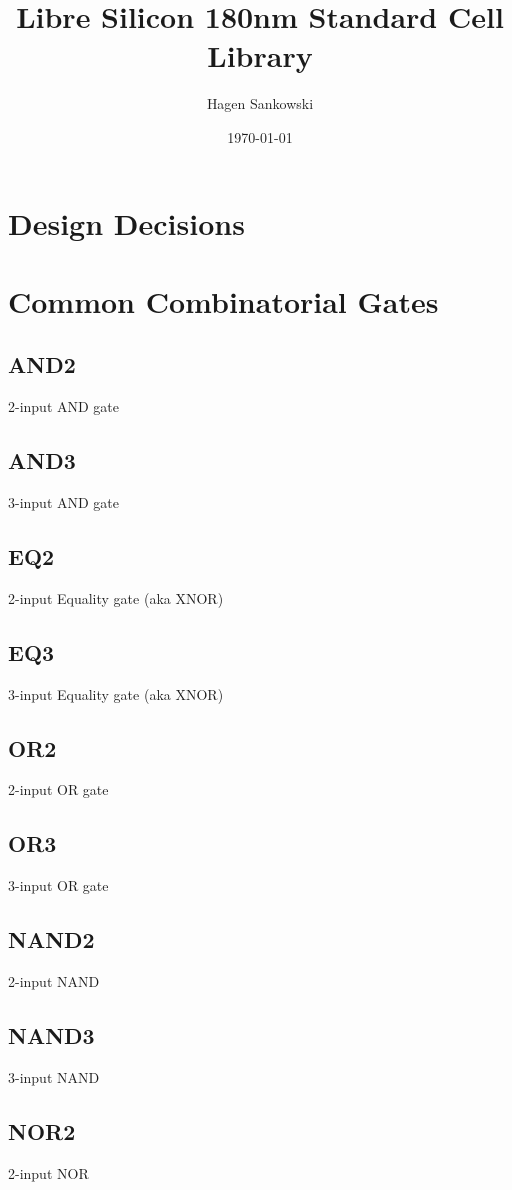 \documentclass[12pt, a4paper, twoside, titlepage]{article}
\title{Libre Silicon 180nm Standard Cell Library}
\author{Hagen Sankowski}
\date{\today}
\begin{document}
\maketitle

\section{Design Decisions}

\section{Common Combinatorial Gates}

\subsection{AND2}
2-input AND gate

\subsection{AND3}
3-input AND gate

\subsection{EQ2}
2-input Equality gate (aka XNOR)

\subsection{EQ3}
3-input Equality gate (aka XNOR)

\subsection{OR2}
2-input OR gate

\subsection{OR3}
3-input OR gate

\subsection{NAND2}
2-input NAND

\subsection{NAND3}
3-input NAND

\subsection{NOR2}
2-input NOR
\end{document}
